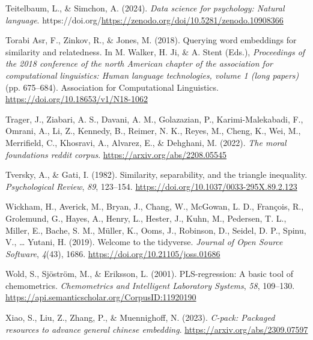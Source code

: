 \documentclass[
  man,
  floatsintext,
  longtable,
  nolmodern,
  notxfonts,
  notimes,
  colorlinks=true,linkcolor=blue,citecolor=blue,urlcolor=blue]{apa7}
\newlength{\cslhangindent}
\newenvironment{CSLReferences}[2] %
 {\begin{list}{}{%
  \setlength{\itemindent}{0pt}
  \setlength{\leftmargin}{0pt}
  \setlength{\parsep}{0pt}
  \ifodd #1
   \setlength{\leftmargin}{\cslhangindent}
   \setlength{\itemindent}{-1\cslhangindent}
  \fi
  \setlength{\itemsep}{#2\baselineskip}}}
 {\end{list}}
\begin{document}
\begin{CSLReferences}{1}{0}
Teitelbaum, L., \& Simchon, A. (2024). \emph{Data science for
psychology: Natural language}.
https://doi.org/\url{https://zenodo.org/doi/10.5281/zenodo.10908366}

Torabi Asr, F., Zinkov, R., \& Jones, M. (2018). Querying word
embeddings for similarity and relatedness. In M. Walker, H. Ji, \& A.
Stent (Eds.), \emph{Proceedings of the 2018 conference of the north
{A}merican chapter of the association for computational linguistics:
Human language technologies, volume 1 (long papers)} (pp. 675--684).
Association for Computational Linguistics.
\url{https://doi.org/10.18653/v1/N18-1062}

Trager, J., Ziabari, A. S., Davani, A. M., Golazazian, P.,
Karimi-Malekabadi, F., Omrani, A., Li, Z., Kennedy, B., Reimer, N. K.,
Reyes, M., Cheng, K., Wei, M., Merrifield, C., Khosravi, A., Alvarez,
E., \& Dehghani, M. (2022). \emph{The moral foundations reddit corpus}.
\url{https://arxiv.org/abs/2208.05545}

Tversky, A., \& Gati, I. (1982). Similarity, separability, and the
triangle inequality. \emph{Psychological Review}, \emph{89}, 123--154.
\url{https://doi.org/10.1037/0033-295X.89.2.123}

Wickham, H., Averick, M., Bryan, J., Chang, W., McGowan, L. D.,
François, R., Grolemund, G., Hayes, A., Henry, L., Hester, J., Kuhn, M.,
Pedersen, T. L., Miller, E., Bache, S. M., Müller, K., Ooms, J.,
Robinson, D., Seidel, D. P., Spinu, V., \ldots{} Yutani, H. (2019).
Welcome to the {tidyverse}. \emph{Journal of Open Source Software},
\emph{4}(43), 1686. \url{https://doi.org/10.21105/joss.01686}

Wold, S., Sjöström, M., \& Eriksson, L. (2001). PLS-regression: A basic
tool of chemometrics. \emph{Chemometrics and Intelligent Laboratory
Systems}, \emph{58}, 109--130.
\url{https://api.semanticscholar.org/CorpusID:11920190}

Xiao, S., Liu, Z., Zhang, P., \& Muennighoff, N. (2023). \emph{C-pack:
Packaged resources to advance general chinese embedding}.
\url{https://arxiv.org/abs/2309.07597}

\end{CSLReferences}

\appendix
\end{document}
